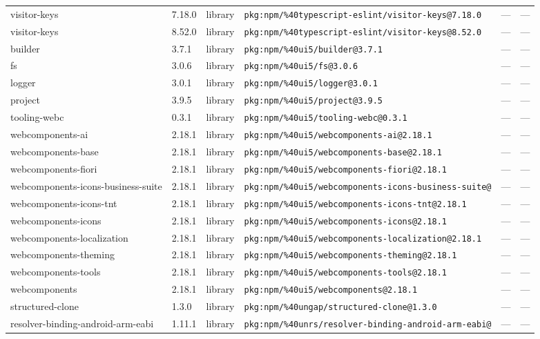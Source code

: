 \documentclass[11pt]{article}
\begin{document}
\begin{longtable}{|l|l|l|p{2.2cm}|l|p{4cm}|}
visitor-keys & 7.18.0 & library & \texttt{pkg:npm/\%40typescript-eslint/visitor-keys@7.18.0} & — & — \\
visitor-keys & 8.52.0 & library & \texttt{pkg:npm/\%40typescript-eslint/visitor-keys@8.52.0} & — & — \\
builder & 3.7.1 & library & \texttt{pkg:npm/\%40ui5/builder@3.7.1} & — & — \\
fs & 3.0.6 & library & \texttt{pkg:npm/\%40ui5/fs@3.0.6} & — & — \\
logger & 3.0.1 & library & \texttt{pkg:npm/\%40ui5/logger@3.0.1} & — & — \\
project & 3.9.5 & library & \texttt{pkg:npm/\%40ui5/project@3.9.5} & — & — \\
tooling-webc & 0.3.1 & library & \texttt{pkg:npm/\%40ui5/tooling-webc@0.3.1} & — & — \\
webcomponents-ai & 2.18.1 & library & \texttt{pkg:npm/\%40ui5/webcomponents-ai@2.18.1} & — & — \\
webcomponents-base & 2.18.1 & library & \texttt{pkg:npm/\%40ui5/webcomponents-base@2.18.1} & — & — \\
webcomponents-fiori & 2.18.1 & library & \texttt{pkg:npm/\%40ui5/webcomponents-fiori@2.18.1} & — & — \\
webcomponents-icons-business-suite & 2.18.1 & library & \texttt{pkg:npm/\%40ui5/webcomponents-icons-business-suite@} & — & — \\
webcomponents-icons-tnt & 2.18.1 & library & \texttt{pkg:npm/\%40ui5/webcomponents-icons-tnt@2.18.1} & — & — \\
webcomponents-icons & 2.18.1 & library & \texttt{pkg:npm/\%40ui5/webcomponents-icons@2.18.1} & — & — \\
webcomponents-localization & 2.18.1 & library & \texttt{pkg:npm/\%40ui5/webcomponents-localization@2.18.1} & — & — \\
webcomponents-theming & 2.18.1 & library & \texttt{pkg:npm/\%40ui5/webcomponents-theming@2.18.1} & — & — \\
webcomponents-tools & 2.18.1 & library & \texttt{pkg:npm/\%40ui5/webcomponents-tools@2.18.1} & — & — \\
webcomponents & 2.18.1 & library & \texttt{pkg:npm/\%40ui5/webcomponents@2.18.1} & — & — \\
structured-clone & 1.3.0 & library & \texttt{pkg:npm/\%40ungap/structured-clone@1.3.0} & — & — \\
resolver-binding-android-arm-eabi & 1.11.1 & library & \texttt{pkg:npm/\%40unrs/resolver-binding-android-arm-eabi@} & — & — \\

\end{longtable}
\end{document}
